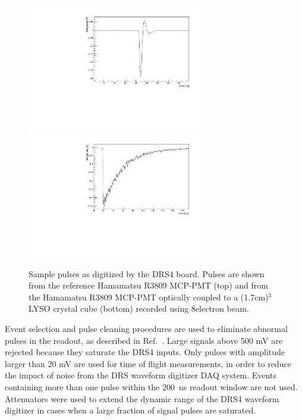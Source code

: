 \begin{figure}[h] \centering
\includegraphics[width=0.7\textwidth]{figs/timing/RefPulse} \\
\includegraphics[width=0.7\textwidth]{figs/timing/run064_event506} 
\caption{ Sample pulses as digitized by the DRS4 board. Pulses are
  shown from the reference Hamamatsu R3809 MCP-PMT (top) and from the Hamamatsu R3809 MCP-PMT
optically coupled to a (1.7\unit{cm})$^{3}$ LYSO crystal cube (bottom)
recorded using  8\GeV electron beam.} 
\label{fig:PulseShapes}
\end{figure}

Event selection and pulse cleaning procedures are used to eliminate abnormal
pulses in the readout, as described in Ref.~\cite{MCPFastCaloNIMA}. Large signals
above 500 mV are rejected because they saturate the DRS4 inputs. Only pulses
with amplitude larger than 20 mV are used for time of flight measurements, in
order to reduce the impact of noise from the DRS waveform digitizer DAQ system.
Events containing more than one pulse within the $200$~ns readout window are not
used. Attenuators were used to extend the dynamic range of the DRS4
waveform digitizer in cases when a large fraction of signal pulses are saturated.

